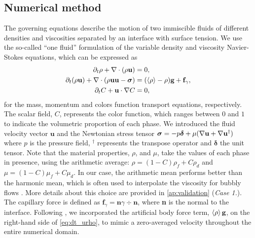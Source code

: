 \documentclass[11pt]{My_preprint}
\providecommand{\DIFaddend}{} %
\begin{document}
 \DIFaddend \subsection{Numerical method}
The governing equations describe the motion of two immiscible fluids of different densities and viscosities separated by an interface with surface tension. 
We use the so-called ``one fluid'' formulation of the variable density and viscosity Navier-Stokes equations, which can be expressed as \citep{tryggvason2011direct}
\begin{align}
    \partial_t \rho+ \mathbf{\nabla}\cdot(\rho\textbf{u})
    &= 0,\\
    \label{eq:dt_urho}
    \partial_t (\rho \textbf{u})
    + \mathbf{\nabla}\cdot (\rho  \textbf{u} \textbf{u} - \bm\sigma)
    &= (\left<\rho\right> - \rho)\textbf{g}
    + \textbf{f}_\gamma,\\
    \label{eq:dt_C}
    \partial_t C + \textbf{u}\cdot\mathbf{\nabla} C  
    &= 0,
\end{align}
for the mass, momentum and colors function transport equations, respectively. 
The scalar field, $C$, represents the color function, which ranges between $0$ and $1$ to indicate the volumetric proportion of each phase.
We introduced the fluid velocity vector $\textbf{u}$ and the Newtonian stress tensor $\bm{\sigma} = -p \bm\delta + \mu (\mathbf{\nabla} \textbf{u}+ \mathbf{\nabla} \textbf{u}^\dagger)$ where $p$ is the pressure field, $^\dagger$ represents the transpose operator and $\bm\delta$ the unit tensor.
Note that the material properties, $\rho$, and $\mu$, take the values of each phase in presence, using the arithmetic average: $\rho = (1-C)\rho_f + C \rho_d$ and $\mu = (1-C)\mu_f + C \mu_d$. 
In our case, the arithmetic mean performs better than the harmonic mean, which is often used to interpolate the viscosity for bubbly flows \citet{hidman2023assessing,innocenti2020direct}.
More details about this choice are provided in \ref{ap:validation} (\textit{Case 1.}). 
The capillary force is defined as $\textbf{f}_\gamma =\textbf{n} \gamma \div \textbf{n} $, where \textbf{n} is the normal to the interface.
Following  \citep{bunner2002dynamics}, we incorporated the artificial body force term, $\left<\rho\right>\textbf{g}$, on the right-hand side of \ref{eq:dt_urho}, to mimic a zero-averaged velocity throughout the entire numerical domain.  
\end{document}
